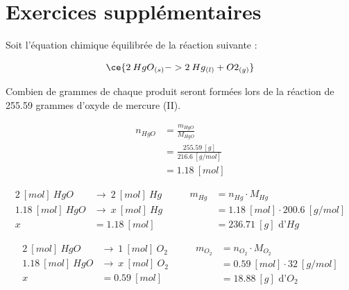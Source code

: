 \documentclass[
  11pt,
  a4paper,
  openany]{book}
\begin{document}
\section{Exercices supplémentaires}\label{exercices-suppluxe9mentaires-10}

\begin{Exercise}

Soit l'équation chimique équilibrée de la réaction suivante :

\[ \ce{ 2\:HgO{}_{(s)} -> 2\:Hg{}_{(l)} + O2{}_{(g)} } \]

Combien de grammes de chaque produit seront formées lors de la réaction de 255.59 grammes d'oxyde de mercure (II).


\end{Exercise}

\begin{Answer}
\[ \begin{split}
    n_{HgO} &= \frac{m_{HgO}}{M_{HgO}} \\
    &= \frac{255.59\ [g]}{216.6\ [g/mol]} \\
    &= 1.18\ [mol]
    \end{split} \]

\[ \begin{split}
  2\ [mol]\ HgO &\rightarrow\ 2\ [mol]\ Hg \\
  1.18\ [mol]\ HgO &\rightarrow\ x\ [mol]\ Hg \\
  x &= 1.18\ [mol]
  \end{split}
    \qquad
    \begin{split}
    m_{Hg} &= n_{Hg} \cdot M_{Hg} \\
  &= 1.18\ [mol] \cdot 200.6\ [g/mol] \\
  &= 236.71\ [g] \text{ d'} Hg
  \end{split} \]

\[ \begin{split}
  2\ [mol]\ HgO &\rightarrow\ 1\ [mol]\ O_2 \\
  1.18\ [mol]\ HgO &\rightarrow\ x\ [mol]\ O_2 \\
  x &= 0.59\ [mol]
  \end{split}
    \qquad
    \begin{split}
    m_{O_{2}} &= n_{O_{2}} \cdot M_{O_{2}} \\
  &= 0.59\ [mol] \cdot 32\ [g/mol] \\
  &= 18.88\ [g] \text{ d'} O_{2}
  \end{split} \]

\end{Answer}
\end{document}
